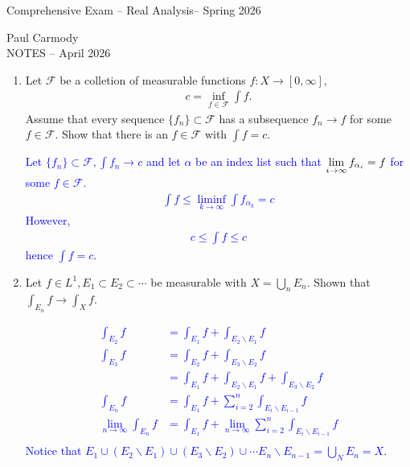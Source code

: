 \documentclass[12pt,a4paper]{report}
\newcommand{\CLASSNAME}{Comprehensive Exam -- Real Analysis}
\newcommand{\STUDENTNAME}{Paul Carmody}
\newcommand{\ASSIGNMENT}{NOTES }
\newcommand{\DUEDATE}{April 2026}
\newcommand{\SEMESTER}{Spring 2026}
\newcommand{\BLUE}[1]{\textcolor{blue}{#1}}
\begin{document}
\begin{center}
	\Large{\CLASSNAME -- \SEMESTER} 
\end{center}
\begin{center}
	\STUDENTNAME \\
	\ASSIGNMENT -- \DUEDATE\\
\end{center} 

\begin{enumerate}

\item Let $\mathcal{F}$ be a colletion of measurable functions $f: X \to [0,\infty]$,
\begin{align*}
	c = \inf_{f \in \mathcal{F}} \int f.
\end{align*}Assume that every sequence $\{f_n\}\subset \mathcal{F}$ has a subsequence $f_n \to f$ for some $f \in \mathcal{F}$.  Show that there is an $f \in \mathcal{F}$ with $\int f =c$.

\BLUE{Let $\{f_n\} \subset \mathcal{F}, \int f_n \to c$ and let $\alpha$ be an index list such that $\underset{i \to \infty}\lim\,{f_{\alpha_i}} = f$ for some $f \in \mathcal{F}$. 
\begin{align*}
	\int f \le \liminf_{k\to\infty} \int f_{\alpha_k} = c 
\end{align*}However, 
\begin{align*}
	c \le \int f \le c 
\end{align*}hence $\int f = c$.
}

\newpage
\item Let $f \in L^1, E_1\subset E_2\subset \cdots$ be measurable with $X = \bigcup_n E_n$.  Shown that $\int_{E_n} f \to \int_X f$.

\BLUE{
\begin{align*}
	\int_{E_2} f &= \int_{E_1} f + \int_{E_2\backslash E_1} f \\
	\int_{E_3} f &= \int_{E_2} f + \int_{E_3\backslash E_2} f \\
	    &= \int_{E_1} f + \int_{E_2\backslash E_1} f + \int_{E_3\backslash E_2} f \\
	\int_{E_n} f &= \int_{E_1} f + \sum_{i=2}^n \int_{E_i\backslash E_{i-1}} f \\
	\lim_{n\to\infty} \int_{E_n} f &= \int_{E_1} f + \lim_{n\to\infty} \sum_{i=2}^n \int_{E_i\backslash E_{i-1}} f \\
\end{align*}Notice that $E_1 \cup (E_2\backslash E_1) \cup (E_3\backslash E_2) \cup \cdots E_n\backslash E_{n-1} = \bigcup_{N} E_n = X$.
}


\end{enumerate}
\end{document}
